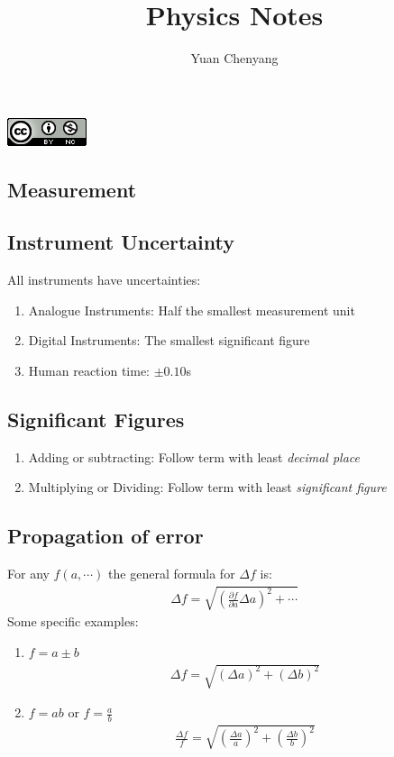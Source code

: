 \documentclass[11pt]{article}
\title{Physics Notes}
\author{Yuan Chenyang}
\makeatletter
\renewcommand\tableofcontents{%
    \@starttoc{toc}%
}
\newcommand{\pd}[2]{
  \ensuremath{
    \frac{\partial #1}{\partial #2} }} %
\makeatother
\begin{document}
\maketitle
\begin{center}
\includegraphics[scale=0.7]{deed.png} 
\end{center}

\begin{multicols}{2}
\tableofcontents
\end{multicols}
\newpage

\begin{multicols*}{3}
\section{Measurement}
\subsection{Instrument Uncertainty}
All instruments have uncertainties:
\begin{enumerate}
\item Analogue Instruments: Half the smallest measurement unit
\item Digital Instruments: The smallest significant figure
\item Human reaction time: $\pm 0.10$s
\end{enumerate}
\subsection{Significant Figures}
\begin{enumerate}
\item Adding or subtracting: Follow term with least {\em decimal place}
\item Multiplying or Dividing: Follow term with least {\em significant figure}
\end{enumerate}
\subsection{Propagation of error}
For any $f(a, \cdots)$ the general formula for $\Delta f$ is:
\begin{align*}
\Delta f = \sqrt{\left( \pd{f}{a} \Delta a \right)^2 + \cdots}
\end{align*}
Some specific examples:
\begin{enumerate}
\item $f=a\pm b$
\begin{align*}
\Delta f = \sqrt{(\Delta a)^2+(\Delta b)^2}
\end{align*}
\item $f=ab$ or $f=\frac{a}{b}$
\begin{align*}
\frac{\Delta f}{f} = \sqrt{\left(\frac{\Delta a}{a} \right)^2+\left(\frac{\Delta b}{b} \right)^2}
\end{align*}
\end{enumerate}

\end{multicols*}
\end{document}
